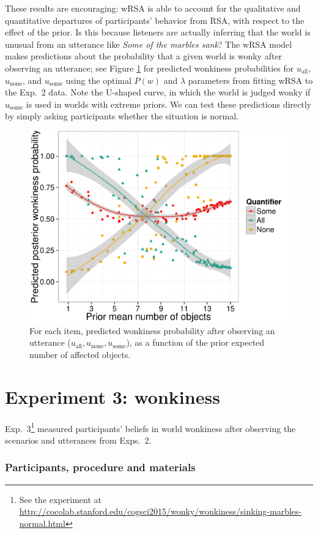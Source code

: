 \documentclass[10pt,letterpaper]{article}
\newcommand{\figref}[1]{Figure \ref{#1}}
\begin{document}
These results are encouraging: wRSA is able to account for the qualitative and quantitative departures of participants' behavior from RSA, with respect to the effect of the prior.
Is this because listeners are actually inferring that the world is unusual from an utterance like \emph{Some of the marbles sank}?
The wRSA model makes predictions about the probability that a given world is wonky after observing an utterance; see \figref{fig:wonkymodel} for predicted wonkiness probabilities for $u_{\textrm{all}}$, $u_{\textrm{none}}$, and $u_{\textrm{some}}$ using the  optimal $P(w)$ and $\lambda$ parameters from fitting wRSA to the Exp.~2 data.
Note the U-shaped curve, in which the world is judged wonky if $u_{\textrm{some}}$ is used in worlds with extreme priors.
 We can test these predictions directly by simply asking participants whether the situation is normal.



\begin{figure}
	\centering
	\includegraphics[width=.43\textwidth]{pics/model-wonkiness-uniform}
	\caption{For each item, predicted wonkiness probability after observing an utterance ($u_{\textrm{all}}, u_{\textrm{none}}, u_{\textrm{some}}$), as a function of the prior expected number of affected objects.}
	\label{fig:wonkymodel}	
\end{figure}

\section{Experiment 3: wonkiness}

Exp.~3\footnote{See the experiment at \scriptsize \url{http://cocolab.stanford.edu/cogsci2015/wonky/wonkiness/sinking-marbles-normal.html}} measured participants' beliefs in world wonkiness after observing the scenarios and utterances from Exps.~2.

\subsubsection{Participants, procedure and materials}
\end{document}
